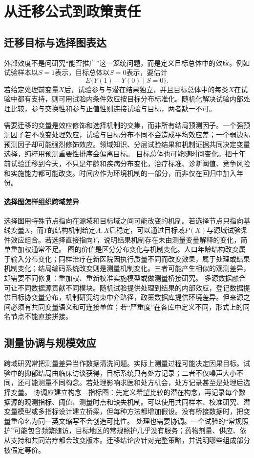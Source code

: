 \section{从迁移公式到政策责任}

\subsection{迁移目标与选择图表达}

外部效度不是问研究“能否推广”这一笼统问题，而是定义目标总体中的效应。例如试验样本以$S=1$表示，目标总体以$S=0$表示，要估计
\[
E\{Y(1)-Y(0)\mid S=0\}.
\]
若给定处理前变量$X$后，试验参与与潜在结果独立，并且目标总体中的每类$X$在试验中都有支持，则可用试验内条件效应按目标分布标准化。随机化解决试验内部处理比较，参与交换性和参与正值性则连接试验与目标，两者缺一不可。

需要迁移的变量是效应修饰和选择机制的交集，而非所有结局预测因子。一个强预测因子若不改变处理效应，试验与目标分布不同不会造成平均效应差；一个弱边际预测因子却可能强烈修饰效应。领域知识、分层试验结果和机制证据共同决定变量选择，纯粹用预测重要性排序会偏离目标。
目标总体也可能随时间变化。把十年前试验迁移到今天，不只是年龄和疾病分布变化，治疗标准、诊断阈值、竞争风险和实施能力都可能改变。时间应作为环境机制的一部分，而非仅在回归中加入年份。

\paragraph{选择图怎样组织跨域差异}

选择图用特殊节点指向在源域和目标域之间可能改变的机制。若选择节点只指向基线变量$X$，而$Y$的结构机制给定$A,X$后稳定，可以通过目标域$P(X)$与源域试验条件效应组合。若选择直接指向$Y$，说明结果机制存在未由测量变量解释的变化，简单重加权通常不足。
图的价值是区分分布变化与机制变化。人口年龄结构改变属于输入分布变化；同样治疗在新医院因执行质量不同而改变效果，属于处理或结果机制变化；结局编码系统改变则是测量机制变化。三者可能产生相似的观测差异，却需要不同修复：重加权、重新校准实施模型或做测量桥接研究。
多源数据融合可让不同数据源贡献不同模块。随机试验提供处理到结果的内部效应，登记数据提供目标协变量分布，机制研究约束中介路径，政策数据库提供环境差异。但来源之间必须有共同变量语义和可连接单位；若“严重度”在各库中定义不同，形式上的同名节点不能直接拼接。

\subsection{测量协调与规模效应}

跨域研究常把测量差异当作数据清洗问题。实际上测量过程可能决定因果目标。试验中的抑郁结局由临床访谈获得，目标系统只有处方记录；二者不仅噪声大小不同，还可能测量不同构念。若处理影响求医和处方机会，处方记录甚至是处理后选择变量。
协调应建立构念---指标图：先定义希望比较的潜在构念，再记录每个数据源的观测指标、阈值、测量时点和缺失机制。可以使用共同样本、校准研究、潜变量模型或多指标设计建立桥梁，但每种方法都增加假设。没有桥接数据时，把变量重命名为同一英文缩写不会创造可比性。
处理也需要协调。一个试验的“常规照护”可能包含频繁随访，目标地区的常规照护几乎没有服务；药物剂量、供应、依从支持和共同治疗都会改变版本。迁移结论应针对完整策略，并说明哪些组成部分被假定等价。


